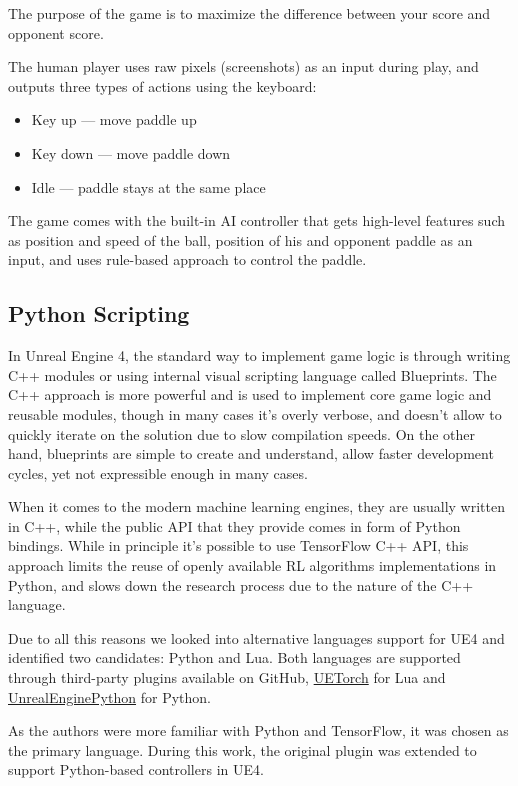 The purpose of the game is to maximize the difference between your score and opponent score.

The human player uses raw pixels (screenshots) as an input during play, and outputs three types of actions using the keyboard:
\begin{itemize}
    \item Key up --- move paddle up
    \item Key down --- move paddle down
    \item Idle --- paddle stays at the same place
\end{itemize}

The game comes with the built-in AI controller that gets high-level features such as position and speed of the ball, position of his and opponent paddle as an input,
and uses rule-based approach to control the paddle.

\subsection{Python Scripting}

In Unreal Engine 4, the standard way to implement game logic is through writing C++ modules or using internal visual scripting language called Blueprints.
The C++ approach is more powerful and is used to implement core game logic and reusable modules, though in many cases it's overly verbose, and doesn't allow to quickly iterate on the solution due to slow compilation speeds.
On the other hand, blueprints are simple to create and understand, allow faster development cycles, yet not expressible enough in many cases.

When it comes to the modern machine learning engines, they are usually written in C++, while the public API that they provide comes in form of Python bindings.
While in principle it's possible to use TensorFlow C++ API, this approach limits the reuse of openly available RL algorithms implementations in Python, and slows down the research process due to the nature of the C++ language.

Due to all this reasons we looked into alternative languages support for UE4 and identified two candidates: Python and Lua.
Both languages are supported through third-party plugins available on GitHub, \href{https://github.com/facebook/UETorch}{UETorch} for Lua and \href{https://github.com/20tab/UnrealEnginePython}{UnrealEnginePython} for Python.

As the authors were more familiar with Python and TensorFlow, it was chosen as the primary language.
During this work, the original plugin was extended to support Python-based controllers in UE4.

